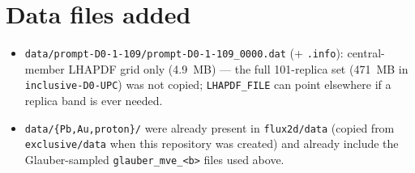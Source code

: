\documentclass[11pt]{article}
\begin{document}
\section{Data files added}

\begin{itemize}
\item \texttt{data/prompt-D0-1-109/prompt-D0-1-109\_0000.dat} (+ \texttt{.info}):
central-member LHAPDF grid only (4.9~MB) — the full 101-replica set
(471~MB in \texttt{inclusive-D0-UPC}) was not copied; \texttt{LHAPDF\_FILE}
can point elsewhere if a replica band is ever needed.
\item \texttt{data/\{Pb,Au,proton\}/} were already present in
\texttt{flux2d/data} (copied from \texttt{exclusive/data} when this
repository was created) and already include the Glauber-sampled
\texttt{glauber\_mve\_<b>} files used above.
\end{itemize}
\end{document}
